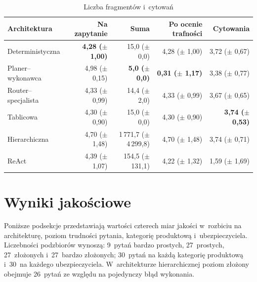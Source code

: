   \begin{table}[H]
    \caption{Liczba fragmentów i~cytowań}\label{tab:fragmenty-i-cytowania}
    \centering
    \small
    \renewcommand{\arraystretch}{1.3}
    \begin{tabular}{@{} l r r r r @{}}
      \toprule
      \textbf{Architektura}
      & \textbf{Na zapytanie}            & \textbf{Suma}                   & \textbf{Po ocenie trafności}    & \textbf{Cytowania}               \\
      \midrule
      Deterministyczna    & \textbf{4{,}28 (\(\pm\) 1{,}00)} & 15{,}0 (\(\pm\) 0{,}0)          & 4{,}28 (\(\pm\) 1{,}00)         & 3{,}72 (\(\pm\) 0{,}67)          \\
      Planer--wykonawca   & 4{,}98 (\(\pm\) 0{,}15)          & \textbf{5{,}0 (\(\pm\) 0{,}0)}  & \textbf{0{,}31 (\(\pm\) 1{,}17)} & 3{,}38 (\(\pm\) 0{,}77)          \\
      Router--specjalista & 4{,}33 (\(\pm\) 0{,}99)          & 14{,}4 (\(\pm\) 2{,}0)          & 4{,}33 (\(\pm\) 0{,}99)         & 3{,}67 (\(\pm\) 0{,}65)          \\
      Tablicowa           & 4{,}30 (\(\pm\) 0{,}90)          & 15{,}0 (\(\pm\) 0{,}0)          & 4{,}30 (\(\pm\) 0{,}90)         & \textbf{3{,}74 (\(\pm\) 0{,}53)} \\
      Hierarchiczna       & 4{,}70 (\(\pm\) 1{,}48)          & 1\,771{,}7 (\(\pm\) 4\,299{,}8) & 4{,}70 (\(\pm\) 1{,}48)         & 3{,}74 (\(\pm\) 0{,}71)          \\
      ReAct               & 4{,}39 (\(\pm\) 1{,}07)          & 154{,}5 (\(\pm\) 131{,}1)       & 4{,}22 (\(\pm\) 1{,}32)         & 1{,}59 (\(\pm\) 1{,}69)          \\
      \bottomrule
    \end{tabular}
  \end{table}

  \section{Wyniki jakościowe}\label{sec:wyniki-jakosciowe}

  Poniższe podsekcje przedstawiają wartości czterech miar jakości w~rozbiciu na
  architekturę, poziom trudności pytania, kategorię produktową i~ubezpieczyciela.
  Liczebności podzbiorów wynoszą: 9~pytań bardzo prostych, 27~prostych,
  27~złożonych i~27~bardzo złożonych; 30~pytań na każdą kategorię produktową
  i~30~na każdego ubezpieczyciela. W~architekturze hierarchicznej poziom złożony
  obejmuje 26~pytań ze względu na pojedynczy błąd wykonania.

